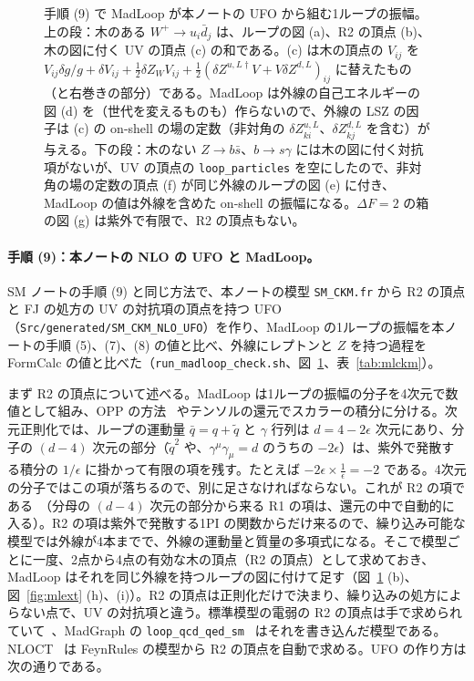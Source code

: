 \documentclass[a4paper,10pt]{ltjsarticle}
\begin{document}
\begin{figure}[tbp]
\caption{手順 (9) で MadLoop が本ノートの UFO から組む1ループの振幅。上の段：木のある $W^+\to u_i\bar d_j$ は、ループの図 (a)、R2 の頂点 (b)、木の図に付く UV の頂点 (c) の和である。(c) は木の頂点の $V_{ij}$ を $V_{ij}\delta g/g+\delta V_{ij}+\frac12\delta Z_WV_{ij}+\frac12(\delta Z^{u,L\dagger}V+V\delta Z^{d,L})_{ij}$ に替えたもの（と右巻きの部分）である。MadLoop は外線の自己エネルギーの図 (d) を（世代を変えるものも）作らないので、外線の LSZ の因子は (c) の on-shell の場の定数（非対角の $\delta Z^{u,L}_{ki}$、$\delta Z^{d,L}_{kj}$ を含む）が与える。下の段：木のない $Z\to b\bar s$、$b\to s\gamma$ には木の図に付く対抗項がないが、UV の頂点の \texttt{loop\_particles} を空にしたので、非対角の場の定数の頂点 (f) が同じ外線のループの図 (e) に付き、MadLoop の値は外線を含めた on-shell の振幅になる。$\Delta F=2$ の箱の図 (g) は紫外で有限で、R2 の頂点もない。}
\label{fig:mlckm}
\end{figure}

\paragraph{手順 (9)：本ノートの NLO の UFO と MadLoop。}SM ノートの手順 (9) と同じ方法で、本ノートの模型 \texttt{SM\_CKM.fr} から R2 の頂点と FJ の処方の UV の対抗項の頂点を持つ UFO（\texttt{Src/generated/SM\_CKM\_NLO\_UFO}）を作り、MadLoop の1ループの振幅を本ノートの手順 (5)、(7)、(8) の値と比べ、外線にレプトンと $Z$ を持つ過程を FormCalc の値と比べた（\texttt{run\_madloop\_check.sh}、図~\ref{fig:mlckm}、表~\ref{tab:mlckm}）。

まず R2 の頂点について述べる。MadLoop は1ループの振幅の分子を4次元で数値として組み、OPP の方法~\cite{opp07} やテンソルの還元でスカラーの積分に分ける。次元正則化では、ループの運動量 $\bar q=q+\tilde q$ と $\gamma$ 行列は $d=4-2\epsilon$ 次元にあり、分子の $(d-4)$ 次元の部分（$\tilde q^2$ や、$\gamma^\mu\gamma_\mu=d$ のうちの $-2\epsilon$）は、紫外で発散する積分の $1/\epsilon$ に掛かって有限の項を残す。たとえば $-2\epsilon\times\frac1\epsilon=-2$ である。4次元の分子ではこの項が落ちるので、別に足さなければならない。これが R2 の項である~\cite{opp08}（分母の $(d-4)$ 次元の部分から来る R1 の項は、還元の中で自動的に入る）。R2 の項は紫外で発散する1PI の関数からだけ来るので、繰り込み可能な模型では外線が4本までで、外線の運動量と質量の多項式になる。そこで模型ごとに一度、2点から4点の有効な木の頂点（R2 の頂点）として求めておき、MadLoop はそれを同じ外線を持つループの図に付けて足す（図~\ref{fig:mlckm} (b)、図~\ref{fig:mlext} (h)、(i)）。R2 の頂点は正則化だけで決まり、繰り込みの処方によらない点で、UV の対抗項と違う。標準模型の電弱の R2 の頂点は手で求められていて~\cite{gmp10,szc11}、MadGraph の \texttt{loop\_qcd\_qed\_sm}~\cite{mg5ew} はそれを書き込んだ模型である。NLOCT~\cite{nloct} は FeynRules の模型から R2 の頂点を自動で求める。UFO の作り方は次の通りである。
\end{document}
